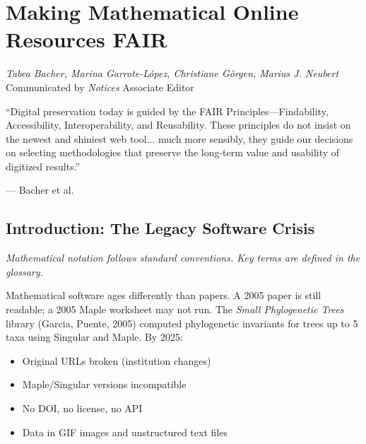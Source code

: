 \chapter{Making Mathematical Online Resources FAIR} \cite{bacher2026fair}
\label{ch:fair}

\begin{flushright}
\textit{Tabea Bacher, Marina Garrote-López, Christiane Görgen, Marius J. Neubert}\\
Communicated by \textit{Notices} Associate Editor
\end{flushright}

\epigraph{``Digital preservation today is guided by the FAIR Principles---Findability, Accessibility, Interoperability, and Reusability. These principles do not insist on the newest and shiniest web tool... much more sensibly, they guide our decisions on selecting methodologies that preserve the long-term value and usability of digitized results.''}{--- Bacher et al.} \cite{bacher2026fair}

\begin{abstract}
Many valuable mathematical databases (OEIS, LMFDB, Small Phylogenetic Trees) were built with early-2000s technology. This chapter presents a case study: modernizing the \textit{Small Phylogenetic Trees} library using FAIR principles. We separate computation from presentation, use OSCAR/Julia for verified computation, and deploy a versioned, documented, licensed resource at \texttt{algebraicphylogenetics.org}, \cite{bacher2026fair}.
\end{abstract}

\section{Introduction: The Legacy Software Crisis}

\noindent\textit{Mathematical notation follows standard conventions. Key terms are defined in the glossary.}\n
\label{sec:fair:intro}

Mathematical software ages differently than papers. A 2005 paper is still readable; a 2005 Maple worksheet may not run. The \textit{Small Phylogenetic Trees} library (Garcia, Puente, 2005) computed phylogenetic invariants for trees up to 5 taxa using Singular and Maple. By 2025:
\begin{itemize}
    \item Original URLs broken (institution changes)
    \item Maple/Singular versions incompatible
    \item No DOI, no license, no API
    \item Data in GIF images and unstructured text files
\end{itemize}

